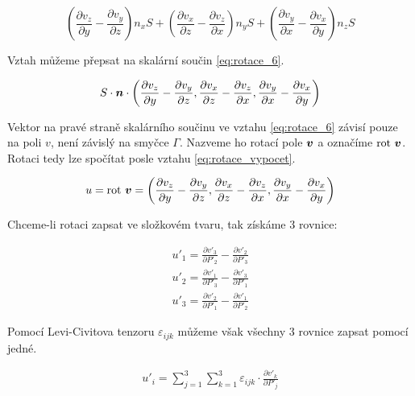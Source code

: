 \begin{equation}
\label{eq:rotace_5}
\left( \frac{\partial v_z}{\partial y} - \frac{\partial v_y}{\partial z} \right) n_x S + \left( \frac{\partial v_x}{\partial z} - \frac{\partial v_z}{\partial x} \right) n_y S + \left( \frac{\partial v_y}{\partial x} - \frac{\partial v_x}{\partial y} \right) n_z S 
\end{equation}

Vztah můžeme přepsat na skalární součin \eqref{eq:rotace_6}.

\begin{equation}
\label{eq:rotace_6}
S \cdot \boldsymbol{n} \cdot \left(\frac{\partial v_z}{\partial y} - \frac{\partial v_y}{\partial z}, \frac{\partial v_x}{\partial z} - \frac{\partial v_z}{\partial x}, \frac{\partial v_y}{\partial x} - \frac{\partial v_x}{\partial y} \right)
\end{equation}

Vektor na pravé straně skalárního součinu ve vztahu \eqref{eq:rotace_6} závisí pouze na poli \(v\), není závislý na smyčce \(\Gamma\). Nazveme ho rotací pole \(\boldsymbol{v}\) a označíme \(\mathrm{rot} \ \boldsymbol{v}\). Rotaci tedy lze spočítat posle vztahu \eqref{eq:rotace_vypocet}.

\begin{equation}
\label{eq:rotace_vypocet}
u = \mathrm{rot} \ \boldsymbol{v} = \left(\frac{\partial v_z}{\partial y} - \frac{\partial v_y}{\partial z}, \frac{\partial v_x}{\partial z} - \frac{\partial v_z}{\partial x}, \frac{\partial v_y}{\partial x} - \frac{\partial v_x}{\partial y} \right)
\end{equation}

Chceme-li rotaci zapsat ve složkovém tvaru, tak získáme 3 rovnice:

\begin{equation}
\begin{split}
u'_1 = \frac{\partial v'_3}{\partial P'_2} - \frac{\partial v'_2}{\partial P'_3} \\
u'_2 = \frac{\partial v'_1}{\partial P'_3} - \frac{\partial v'_3}{\partial P'_1} \\
u'_3 = \frac{\partial v'_2}{\partial P'_1} - \frac{\partial v'_1}{\partial P'_2}
\end{split}
\end{equation}

Pomocí Levi-Civitova tenzoru \(\varepsilon_{ijk}\) můžeme však všechny 3 rovnice zapsat pomocí jedné.

\begin{equation}
\label{eq:rotace_tenzorova}
\begin{split}
u'_i = \sum_{j=1}^3 \sum_{k=1}^3 \varepsilon_{ijk} \cdot \frac{\partial v'_k}{\partial P'_j}
\end{split}
\end{equation}

